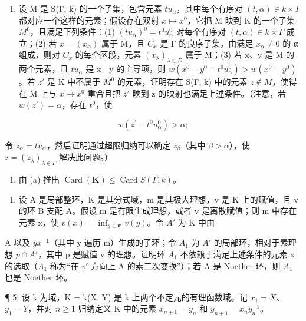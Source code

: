 \begin{enumerate}
\def\labelenumi{(\alph{enumi})}
\tightlist
\item
  设 M 是 S(Γ, k) 的一个子集，包含元素 \(tu_{\alpha}\)，其中每个有序对 \((t, \alpha) \in k \times \Gamma\) 都对应一个这样的元素；假设存在双射 \(x \mapsto x^{0}\)，它把 M 映到 K 的一个子集 \(M^{0}\)，且满足下列条件：(1) \((tu_{\alpha})^{0} = t^{0}u_{\alpha}^{0}\) 对每个有序对 \((t, \alpha) \in k \times \Gamma\) 成立；(2) 若 \(x = (x_{\alpha})\) 属于 M，且 \(C_{x}\) 是 Γ 的良序子集，由满足 \(x_{\alpha} \neq 0\) 的 α 组成，则对 \(C_{x}\) 的每个区段，元素 \((x_{\lambda})_{\lambda \in D}\) 属于 M；(3) 若 x、y 是 M 的两个元素，且 \(tu_{\alpha}\) 是 x - y 的主导项，则 \(w(x^{0} - y^{0} - t^{0}u_{\alpha}^{0}) > w(x^{0} - y^{0})\)。若 \(z'\) 是 K 中不属于 \(M^{0}\) 的元素，证明存在 S(Γ, k) 中的元素 \(z \notin M\)，使得在 M 上与 \(x \mapsto x^{0}\) 重合且把 \(z'\) 映到 z 的映射也满足上述条件。（注意，若 \(w(z') = \alpha\)，存在 \(t^{0}\)，使
\end{enumerate}

\[
w (z ^ {\prime} - t ^ {0} u _ {\alpha} ^ {0}) > \alpha ;
\]

令 \(z_{\alpha} = tu_{\alpha}\)，然后证明通过超限归纳可以确定 \(z_{\beta}\)（其中 \(\beta > \alpha\)），使 \(z = (z_{\lambda})_{\lambda \in \Gamma}\) 解决此问题。）

\begin{enumerate}
\def\labelenumi{(\alph{enumi})}
\setcounter{enumi}{1}
\tightlist
\item
  由 (a) 推出 \(\operatorname{Card}(\mathbf{K}) \leqslant \operatorname{Card} S(\Gamma, k)\)。
\end{enumerate}

\begin{enumerate}
\def\labelenumi{\arabic{enumi}.}
\setcounter{enumi}{3}
\tightlist
\item
  设 A 是局部整环，K 是其分式域，m 是其极大理想，v 是 K 上的赋值，且 v 的环 B 支配 A。假设 m 是有限生成理想，或者 v 是离散赋值；则 m 中存在元素 x，使 \(v(x) = \inf_{y \in \mathfrak{m}} v(y)\)。令 \(A'\) 为 K 中由
\end{enumerate}

A 以及 \(yx^{-1}\)（其中 y 遍历 m）生成的子环；令 \(A_{1}\) 为 \(A'\) 的局部环，相对于素理想 \(p \cap A'\)，其中 p 是赋值 v 的理想。证明环 \(A_{1}\) 不依赖于满足上述条件的元素 x 的选取（\(A_{1}\) 称为“在 \(v'\) 方向上 A 的素二次变换”）；若 A 是 Noether 环，则 \(A_{1}\) 也是 Noether 环。

¶ 5. 设 k 为域，K = k(X, Y) 是 k 上两个不定元的有理函数域。记 \(x_{1} = X\)、\(y_{1} = Y\)，并对 \(n \geqslant 1\) 归纳定义 K 中的元素 \(x_{n+1} = y_{n}\) 和 \(y_{n+1} = x_{n}y_{n}^{-1}\)。

